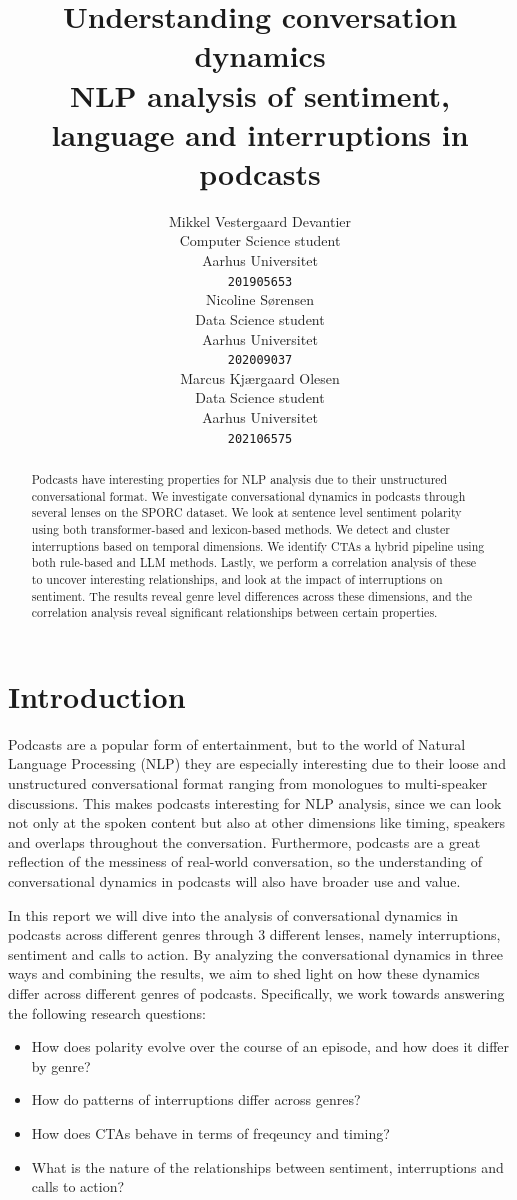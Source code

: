 \documentclass{article}
\title{Understanding conversation dynamics\\NLP analysis of sentiment, language and interruptions in podcasts}
\author{
  Mikkel Vestergaard Devantier\\
  Computer Science student\\
  Aarhus Universitet\\
  \texttt{201905653} \\
  \And
  Nicoline Sørensen\\
  Data Science student\\
  Aarhus Universitet\\
  \texttt{202009037} \\
  \And
  Marcus Kjærgaard Olesen\\
  Data Science student\\
  Aarhus Universitet\\
  \texttt{202106575}\\
}
\begin{document}
\maketitle

\begin{abstract}
  Podcasts have interesting properties for NLP analysis due to their unstructured conversational format. We investigate conversational dynamics in podcasts through several lenses on the SPORC dataset. We look at sentence level sentiment polarity using both transformer-based and lexicon-based methods. We detect and cluster interruptions based on temporal dimensions. We identify CTAs a hybrid pipeline using both rule-based and LLM methods.
  Lastly, we perform a correlation analysis of these to uncover interesting relationships, and look at the impact of interruptions on sentiment. The results reveal genre level differences across these dimensions, and the correlation analysis reveal significant relationships between certain properties.
\end{abstract}


\section{Introduction}
Podcasts are a popular form of entertainment, but to the world of Natural Language Processing (NLP) they are especially interesting due to their loose and unstructured conversational format ranging from monologues to multi-speaker discussions. This makes podcasts interesting for NLP analysis, since we can look not only at the spoken content but also at other dimensions like timing, speakers and overlaps throughout the conversation. Furthermore, podcasts are a great reflection of the messiness of real-world conversation, so the understanding of conversational dynamics in podcasts will also have broader use and value.

In this report we will dive into the analysis of conversational dynamics in podcasts across different genres through 3 different lenses, namely interruptions, sentiment and calls to action. By analyzing the conversational dynamics in three ways and combining the results, we aim to shed light on how these dynamics differ across different genres of podcasts. Specifically, we work towards answering the following research questions:
\begin{itemize}
    \item [\textbf{RQ1:}] How does polarity evolve over the course of an episode, and how does it differ by genre?
    \item [\textbf{RQ2:}] How do patterns of interruptions differ across genres?
    \item [\textbf{RQ3:}] How does CTAs behave in terms of freqeuncy and timing?
    \item [\textbf{RQ4:}] What is the nature of the relationships between sentiment, interruptions and calls to action?
\end{itemize}
\end{document}
